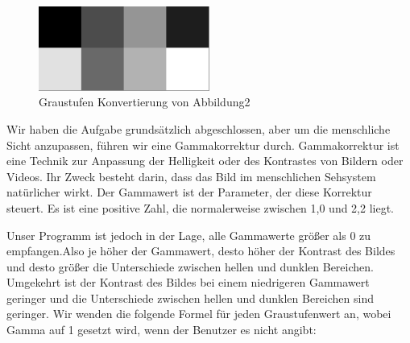 \documentclass[course=erap]{aspdoc}
\begin{document}
\begin{figure}[h]
    \centering
    \includegraphics[width=0.5\textwidth]{Bilder/gamma1.pgm.png}
    \caption{Graustufen Konvertierung von Abbildung2}
    \end{figure}

\par
Wir haben die Aufgabe grundsätzlich abgeschlossen, aber um die menschliche Sicht anzupassen, führen wir eine Gammakorrektur durch. Gammakorrektur ist eine Technik zur Anpassung der Helligkeit oder des Kontrastes von Bildern oder Videos. Ihr Zweck besteht darin, dass das Bild im menschlichen Sehsystem natürlicher wirkt. Der Gammawert ist der Parameter, der diese Korrektur steuert. Es ist eine positive Zahl, die normalerweise zwischen 1,0 und 2,2 liegt.
\par
Unser Programm ist jedoch in der Lage, alle Gammawerte größer als 0 zu empfangen.Also je höher der Gammawert, desto höher der Kontrast des Bildes und desto größer die Unterschiede zwischen hellen und dunklen Bereichen. Umgekehrt ist der Kontrast des Bildes bei einem niedrigeren Gammawert geringer und die Unterschiede zwischen hellen und dunklen Bereichen sind geringer. Wir wenden die folgende Formel für jeden Graustufenwert an, wobei Gamma auf 1 gesetzt wird, wenn der Benutzer es nicht angibt:
\end{document}
